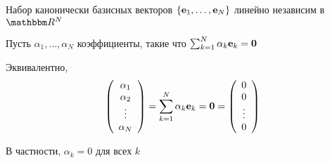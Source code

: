 \begin{frame}
    
    \vspace{2em}
    \Eg
    Набор канонически базисных векторов $\{{\mathbf e}_1, \ldots, {\mathbf e}_N\}$
    линейно независим в $\RR^N$
    
    \Prf Пусть $\alpha_1, \ldots, \alpha_N$ коэффициенты, такие что
    $\sum_{k=1}^N \alpha_k {\mathbf e}_k = {\mathbf 0}$

    Эквивалентно,
    \begin{equation*}
        \left(
        \begin{array}{c}
            \alpha_1 \\
            \alpha_2 \\
            \vdots \\
            \alpha_N
        \end{array}
        \right)
        = \sum_{k=1}^N \alpha_k {\mathbf e}_k 
        = {\mathbf 0}
        =
        \left(
        \begin{array}{c}
            0 \\
            0 \\
            \vdots \\
            0
        \end{array}
        \right)
    \end{equation*}

    \vspace{1em}

    В частности, $\alpha_k = 0$ для всех $k$
    
\end{frame}




